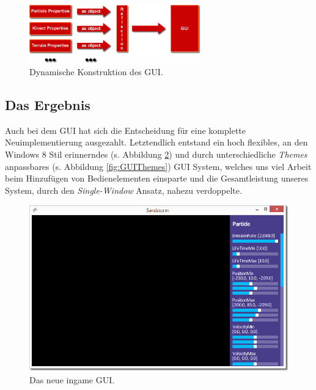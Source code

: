 \begin{Spacing}{\mylinespace}
\begin{description}
\begin{figure}[h!]
	\centering
	\vspace*{20px}
	\includegraphics[width=280px]{graphics/GUIReflect.png}	
	\caption{Dynamische Konstruktion des GUI.}
	\label{fig:GUIReflect}
\end{figure}
	
\end{description}

\subsection{Das Ergebnis}
Auch bei dem GUI hat sich die Entscheidung für eine komplette Neuimplementierung ausgezahlt. Letztendlich entstand ein hoch flexibles, an den Windows 8 Stil erinnerndes (s. Abbildung \ref{fig:NewGui}) und durch unterschiedliche \textit{Themes} anpassbares (s. Abbildung \ref{fig:GUIThemes}) GUI System, welches uns viel Arbeit beim Hinzufügen von Bedienelementen einsparte und die Gesamtleistung unseres System, durch den \textit{Single-Window} Ansatz, nahezu verdoppelte.

\begin{figure}[h!]
	\centering
	\vspace*{10px}
	\includegraphics[width=\columnwidth]{graphics/newGui2.png}
	\caption{Das neue ingame GUI.}
	\label{fig:NewGui}
\end{figure}


\end{Spacing}
